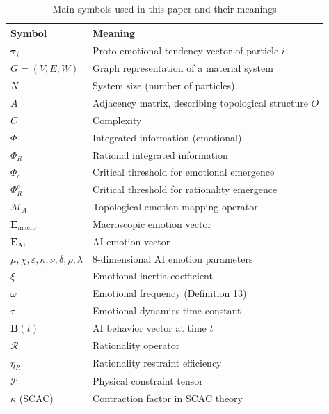 \documentclass[12pt,a4paper]{article}
\theoremstyle{plain}
\newcommand{\ve}[1]{\bm{#1}}                    %
\newcommand{\Evec}{\ve{E}}                        %
\newcommand{\tauvec}{\ve{\tau}}                   %
\newcommand{\Bvec}{\ve{B}}                        %
\begin{document}
\begin{table}[h]
\centering
\caption{Main symbols used in this paper and their meanings}
\begin{tabular}{ll}
\toprule
\textbf{Symbol} & \textbf{Meaning} \\
\midrule
$\tauvec_i$ & Proto-emotional tendency vector of particle $i$ \\
$G=(V,E,W)$ & Graph representation of a material system \\
$N$ & System size (number of particles) \\
$A$ & Adjacency matrix, describing topological structure $O$ \\
$C$ & Complexity \\
$\Phi$ & Integrated information (emotional) \\
$\Phi_R$ & Rational integrated information \\
$\Phi_c$ & Critical threshold for emotional emergence \\
$\Phi_R^c$ & Critical threshold for rationality emergence \\
$\mathcal{M}_A$ & Topological emotion mapping operator \\
$\Evec_{\text{macro}}$ & Macroscopic emotion vector \\
$\Evec_{\text{AI}}$ & AI emotion vector \\
$\mu, \chi, \varepsilon, \kappa, \nu, \delta, \rho, \lambda$ & 8-dimensional AI emotion parameters \\
$\xi$ & Emotional inertia coefficient \\
$\omega$ & Emotional frequency (Definition 13) \\
$\tau$ & Emotional dynamics time constant \\
$\Bvec(t)$ & AI behavior vector at time $t$ \\
$\mathcal{R}$ & Rationality operator \\
$\eta_R$ & Rationality restraint efficiency \\
$\mathcal{P}$ & Physical constraint tensor \\
$\kappa$ (SCAC) & Contraction factor in SCAC theory \\
\bottomrule
\end{tabular}
\end{table}
\end{document}
